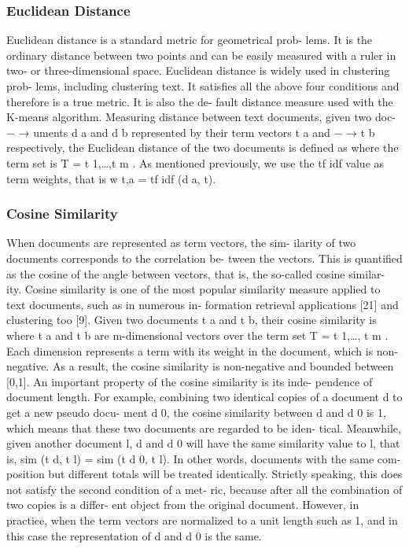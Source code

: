 \documentclass{VUMIFInfKursinis}
\begin{document}
\subsubsection{Euclidean Distance}
Euclidean distance is a standard metric for geometrical prob- lems. It is the ordinary distance between two points and can be easily measured with a ruler in two- or three-dimensional space. Euclidean distance is widely used in clustering prob- lems, including clustering text. It satisfies all the above four conditions and therefore is a true metric. It is also the de- fault distance measure used with the K-means algorithm.
Measuring distance between text documents, given two doc- − → uments d a and d b represented by their term vectors t a and − → t b respectively, the Euclidean distance of the two documents is defined as
where the term set is T = {t 1,\ldots,t m }. As mentioned previously, we use the tf idf value as term weights, that is w t,a = tf idf (d a, t).
\subsubsection{Cosine Similarity}
When documents are represented as term vectors, the sim- ilarity of two documents corresponds to the correlation be- tween the vectors. This is quantified as the cosine of the angle between vectors, that is, the so-called cosine similar- ity. Cosine similarity is one of the most popular similarity measure applied to text documents, such as in numerous in- formation retrieval applications [21] and clustering too [9].
Given two documents t a and t b, their cosine similarity is
where t a and t b are m-dimensional vectors over the term set T = {t 1,\ldots, t m }. Each dimension represents a term with its weight in the document, which is non-negative. As a result, the cosine similarity is non-negative and bounded between [0,1].
An important property of the cosine similarity is its inde- pendence of document length. For example, combining two identical copies of a document d to get a new pseudo docu- ment d 0, the cosine similarity between d and d 0 is 1, which means that these two documents are regarded to be iden- tical. Meanwhile, given another document l, d and d 0 will have the same similarity value to l, that is, sim (t d, t l) = sim (t d 0, t l). In other words, documents with the same com- position but different totals will be treated identically. Strictly speaking, this does not satisfy the second condition of a met- ric, because after all the combination of two copies is a differ- ent object from the original document. However, in practice, when the term vectors are normalized to a unit length such as 1, and in this case the representation of d and d 0 is the same.
\end{document}
